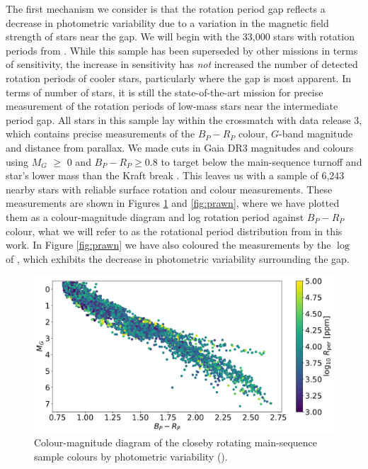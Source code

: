 The first mechanism we consider is that the rotation period gap reflects a decrease in photometric variability due to a variation in the magnetic field strength of stars near the gap.
We will begin with the 33,000 stars with rotation periods from \citet{mcquillan_rotation_2014}.
While this sample has been superseded by other missions in terms of sensitivity, the increase in sensitivity has \textit{not} increased the number of detected rotation periods of cooler stars, particularly where the gap is most apparent.
In terms of number of stars, it is still the state-of-the-art mission for precise measurement of the rotation periods of low-mass stars near the intermediate period gap.
All stars in this sample lay within the crossmatch with \gaia{} data release 3, which contains precise measurements of the $B_P - R_P$ colour, $G$-band magnitude and distance from parallax.
We made cuts in Gaia DR3 magnitudes and colours using $M_G$ $\geq$ 0 and $B_P - R_P \geq 0.8$ to target below the main-sequence turnoff and star's lower mass than the Kraft break \citep{kraft_studies_1967}.
This leaves us with a sample of 6,243 nearby stars with reliable surface rotation and colour measurements.
These measurements are shown in Figures \ref{fig:hr} and \ref{fig:prawn}, where we have plotted them as a colour-magnitude diagram and log rotation period against \gaia{} $B_P-R_P$ colour, what we will refer to as the rotational period distribution from in this work.
In Figure \ref{fig:prawn} we have also coloured the measurements by the $\log$ of \rper{}, which exhibits the decrease in photometric variability surrounding the gap.

\begin{figure}
\centering
  \includegraphics[width=\textwidth]{Figures/rot_gap_figures/HR.png}
  \caption[Colour-magnitude diagram of the closeby rotating main-sequence sample colours by photometric variability (\rper{}).]{
  Colour-magnitude diagram of the closeby rotating main-sequence sample colours by photometric variability (\rper{}).}
  \label{fig:hr}
\end{figure}

